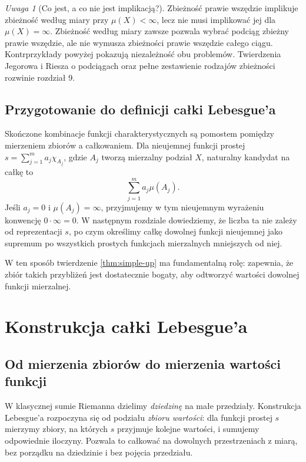 \documentclass[11pt,a4paper,oneside]{book}
\numberwithin{equation}{chapter}
\theoremstyle{plain}
\theoremstyle{definition}
\theoremstyle{remark}
\newtheorem{uwaga}[twierdzenie]{Uwaga}
\begin{document}
\begin{uwaga}[Co jest, a co nie jest implikacją?]
Zbieżność prawie wszędzie implikuje zbieżność
według miary przy $\mu(X)<\infty$, lecz nie musi
implikować jej dla $\mu(X)=\infty$.
Zbieżność według miary zawsze pozwala wybrać podciąg
zbieżny prawie wszędzie, ale nie wymusza zbieżności
prawie wszędzie całego ciągu. Kontrprzykłady powyżej
pokazują niezależność obu problemów. Twierdzenia
Jegorowa i Riesza o podciągach oraz pełne zestawienie
rodzajów zbieżności rozwinie rozdział 9.
\end{uwaga}

\section{Przygotowanie do definicji całki Lebesgue'a}

Skończone kombinacje funkcji charakterystycznych są
pomostem pomiędzy mierzeniem zbiorów a całkowaniem.
Dla nieujemnej funkcji prostej $s=\sum_{j=1}^m
a_j\chi_{A_j}$, gdzie $A_j$ tworzą mierzalny
podział $X$, naturalny kandydat na całkę to
\[
\sum_{j=1}^m a_j\mu(A_j).
\]
Jeśli $a_j=0$ i $\mu(A_j)=\infty$, przyjmujemy
w tym nieujemnym wyrażeniu konwencję $0\cdot\infty=0$.
W następnym rozdziale dowiedziemy, że liczba ta
nie zależy od reprezentacji $s$, po czym określimy
całkę dowolnej funkcji nieujemnej jako supremum
po wszystkich prostych funkcjach mierzalnych
mniejszych od niej.

W ten sposób twierdzenie \ref{thm:simple-up}
ma fundamentalną rolę: zapewnia, że zbiór takich
przybliżeń jest dostatecznie bogaty, aby odtworzyć
wartości dowolnej funkcji mierzalnej.



\chapter{Konstrukcja całki Lebesgue'a}
\label{ch:calkowanie-lebesgue}

\section{Od mierzenia zbiorów do mierzenia wartości funkcji}

W klasycznej sumie Riemanna dzielimy \emph{dziedzinę} na małe
przedziały. Konstrukcja Lebesgue'a rozpoczyna się od podziału
\emph{zbioru wartości}: dla funkcji prostej $s$ mierzymy zbiory,
na których $s$ przyjmuje kolejne wartości, i sumujemy odpowiednie
iloczyny. Pozwala to całkować na dowolnych przestrzeniach z miarą,
bez porządku na dziedzinie i bez pojęcia przedziału.
\end{document}
